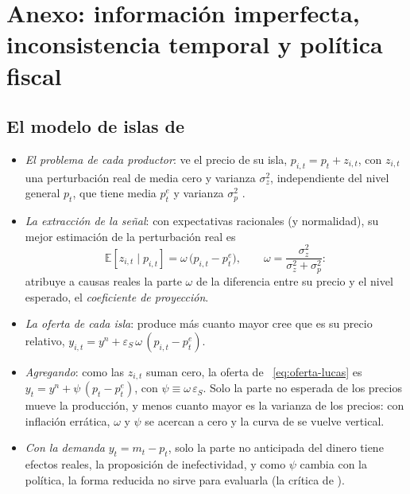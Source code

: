 \documentclass[11pt]{article}
\begin{document}
\section{Anexo: información imperfecta, inconsistencia temporal\cortetitulo{} y política fiscal}\label{anexo:otras-explicaciones}

\subsection{El modelo de islas de }\label{anexo:lucas}

\begin{itemize}
\item \emph{El problema de cada productor}: ve el precio de su isla, $p_{i,t}=p_t+z_{i,t}$, con $z_{i,t}$ una perturbación real de media cero y varianza $\sigma^2_z$, independiente del nivel general $p_t$, que tiene media $p^e_t$ y varianza $\sigma^2_p$\nocite{Lucas1972Expectations,Lucas1973Some} .
\item \emph{La extracción de la señal}: con expectativas racionales (y normalidad), su mejor estimación de la perturbación real es
  \begin{equation*}
  \mathbb{E}[z_{i,t}\mid p_{i,t}]=\omega\,\big(p_{i,t}-p^e_t\big),\qquad\omega=\frac{\sigma^2_z}{\sigma^2_z+\sigma^2_p}:
  \end{equation*}
  atribuye a causas reales la parte $\omega$ de la diferencia entre su precio y el nivel esperado, el \emph{coeficiente de proyección}.
\item \emph{La oferta de cada isla}: produce más cuanto mayor cree que es su precio relativo, $y_{i,t}=y^n+\varepsilon_S\,\omega\,(p_{i,t}-p^e_t)$.
\item \emph{Agregando}: como las $z_{i,t}$ suman cero, la oferta de ~\eqref{eq:oferta-lucas} es $y_t=y^n+\psi\,(p_t-p^e_t)$, con $\psi\equiv\omega\,\varepsilon_S$. Solo la parte no esperada de los precios mueve la producción, y menos cuanto mayor es la varianza de los precios: con inflación errática, $\omega$ y $\psi$ se acercan a cero y la curva de  se vuelve vertical.
\item \emph{Con la demanda} $y_t=m_t-p_t$, solo la parte no anticipada del dinero tiene efectos reales, la proposición de inefectividad\nocite{SargentWallace1975Rational}, y como $\psi$ cambia con la política, la forma reducida no sirve para evaluarla (la crítica de ).\findemo
\end{itemize}
\end{document}
